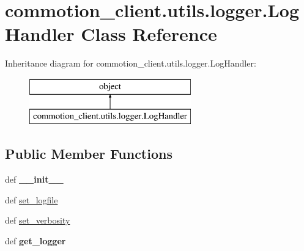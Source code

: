 \hypertarget{classcommotion__client_1_1utils_1_1logger_1_1LogHandler}{\section{commotion\-\_\-client.\-utils.\-logger.\-Log\-Handler Class Reference}
\label{classcommotion__client_1_1utils_1_1logger_1_1LogHandler}
}
Inheritance diagram for commotion\-\_\-client.\-utils.\-logger.\-Log\-Handler\-:\begin{figure}[H]
\begin{center}
\leavevmode
\includegraphics[height=2.000000cm]{classcommotion__client_1_1utils_1_1logger_1_1LogHandler}
\end{center}
\end{figure}
\subsection*{Public Member Functions}
\begin{DoxyCompactItemize}
\item 
\hypertarget{classcommotion__client_1_1utils_1_1logger_1_1LogHandler_a505b62933baef8f074b615aad533d059}{def {\bfseries \-\_\-\-\_\-init\-\_\-\-\_\-}}\label{classcommotion__client_1_1utils_1_1logger_1_1LogHandler_a505b62933baef8f074b615aad533d059}

\item 
def \hyperlink{classcommotion__client_1_1utils_1_1logger_1_1LogHandler_a1d1431f7384b19dc25e176361b7eeb23}{set\-\_\-logfile}
\item 
def \hyperlink{classcommotion__client_1_1utils_1_1logger_1_1LogHandler_a3d76d342b09b2d51753751e5f64f48df}{set\-\_\-verbosity}
\item 
\hypertarget{classcommotion__client_1_1utils_1_1logger_1_1LogHandler_ac9b855879e61081132fae4067b330507}{def {\bfseries get\-\_\-logger}}\label{classcommotion__client_1_1utils_1_1logger_1_1LogHandler_ac9b855879e61081132fae4067b330507}

\end{DoxyCompactItemize}
